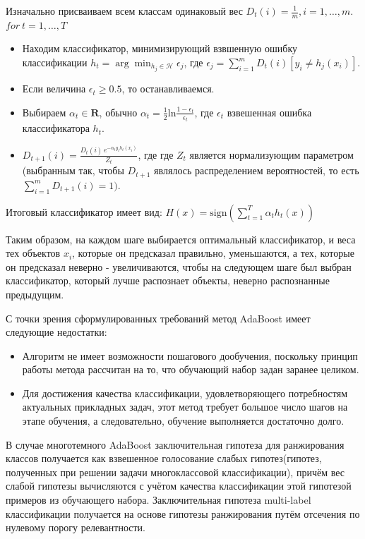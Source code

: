 \documentclass[russian, utf8, emptystyle]{eskdtext}
\begin{document}
Изначально присваиваем всем классам одинаковый вес $D_{t}(i) = \frac{1}{m}, i=1,\ldots,m.$
$for~t = 1, \ldots, T$
\begin{itemize}
	\item Находим классификатор, минимизирующий взвшенную ошибку классификации $ h_{t} = \arg \min_{h_{j} \in \mathcal{H}} \epsilon_{j}$, где  $\epsilon_{j} = \sum_{i=1}^{m} D_{t}(i)[y_i \ne h_{j}(x_{i})]$.
	\item Если величина $\epsilon_{t} \geqslant 0.5$, то останавливаемся.
	\item Выбираем $\alpha_{t} \in \mathbf{R}$, обычно $\alpha_{t}=\frac{1}{2}\textrm{ln}\frac{1-\epsilon_{t}}{\epsilon_{t}}$, где $\epsilon_{t}$ взвешенная ошибка классификатора $h_{t}$.
	\item $D_{t+1}(i) = \frac{ D_{t}(i) \, e^{- \alpha_{t} y_{i} h_{t}(x_{i})} }{ Z_{t} }$, где где $Z_{t}$ является нормализующим параметром (выбранным так, чтобы $D_{t+1}$ являлось распределением вероятностей, то есть $\sum_{i=1}^{m} D_{t+1}(i) = 1)$.
\end{itemize}

Итоговый классификатор имеет вид: $H(x) = \textrm{sign}\left( \sum_{t=1}^{T} \alpha_{t}h_{t}(x)\right)$

Таким образом, на каждом шаге выбирается оптимальный классификатор, и веса тех объектов $x_i$, которые он предсказал правильно, уменьшаются, а тех, которые он предсказал неверно - увеличиваются, чтобы на следующем шаге был выбран классификатор, который лучше распознает объекты, неверно распознанные предыдущим.

С точки зрения сформулированных требований метод AdaBoost имеет следующие недостатки:
\begin{itemize}
	\item Алгоритм не имеет возможности пошагового дообучения, поскольку принцип работы метода рассчитан на то, что обучающий набор задан заранее целиком.
	\item Для достижения качества классификации, удовлетворяющего потребностям актуальных прикладных задач, этот метод требует большое число шагов на этапе обучения, а следовательно, обучение выполняется достаточно долго.
\end{itemize}

В случае многотемного AdaBoost заключительная гипотеза для ранжирования классов получается как взвешенное голосование слабых гипотез(гипотез, полученных при решении задачи многоклассовой классификации), причём вес слабой гипотезы вычисляются с учётом качества классификации этой гипотезой примеров из обучающего набора. Заключительная гипотеза multi-label классификации получается на основе гипотезы ранжирования путём отсечения по нулевому порогу релевантности.
\end{document}
